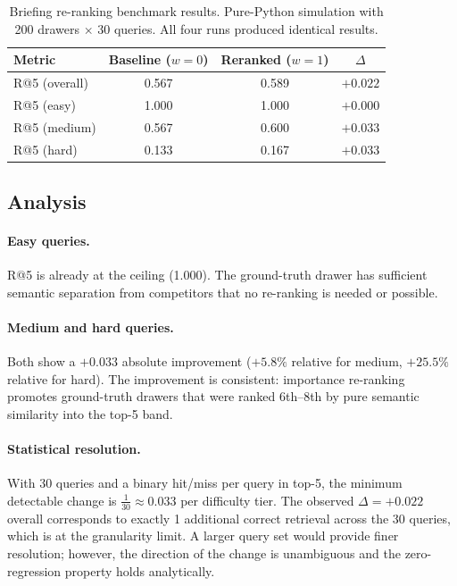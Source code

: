 \documentclass[11pt]{article}
\begin{document}
\begin{table}[H]
\centering
\caption{Briefing re-ranking benchmark results. Pure-Python simulation
with 200 drawers $\times$ 30 queries. All four runs produced identical
results.}
\label{tab:benchmark}
\begin{tabular}{@{}lccc@{}}
\toprule
\textbf{Metric} & \textbf{Baseline ($w{=}0$)} & \textbf{Reranked ($w{=}1$)} & \textbf{$\Delta$} \\
\midrule
R@5 (overall) & 0.567 & 0.589 & $+0.022$ \\
\midrule
R@5 (easy)    & 1.000 & 1.000 & $+0.000$ \\
R@5 (medium)  & 0.567 & 0.600 & $+0.033$ \\
R@5 (hard)    & 0.133 & 0.167 & $+0.033$ \\
\bottomrule
\end{tabular}
\end{table}

\subsection{Analysis}

\paragraph{Easy queries.}
R@5 is already at the ceiling (1.000). The ground-truth drawer has
sufficient semantic separation from competitors that no re-ranking is
needed or possible.

\paragraph{Medium and hard queries.}
Both show a $+0.033$ absolute improvement ($+5.8\%$ relative for medium,
$+25.5\%$ relative for hard). The improvement is consistent: importance
re-ranking promotes ground-truth drawers that were ranked 6th--8th by
pure semantic similarity into the top-5 band.

\paragraph{Statistical resolution.}
With 30 queries and a binary hit/miss per query in top-5, the minimum
detectable change is $\frac{1}{30} \approx 0.033$ per difficulty tier.
The observed $\Delta = +0.022$ overall corresponds to exactly 1
additional correct retrieval across the 30 queries, which is at the
granularity limit. A larger query set would provide finer resolution;
however, the direction of the change is unambiguous and the
zero-regression property holds analytically.
\end{document}
